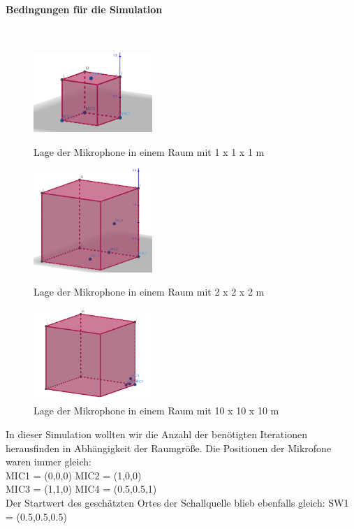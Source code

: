 \paragraph{Bedingungen für die Simulation}\ \\
\begin{figure}
\centering 
\includegraphics[width=0.4\textwidth]{Lage_MIC_AW2}
\caption{Lage der Mikrophone in einem Raum mit 1 x 1 x 1 m}\label{fig:Lage der Mikrophone in einem Raum mit 1 x 1 x 1 m}
\includegraphics[width=0.4\textwidth]{Lage_MIC_AW2_2}
\caption{Lage der Mikrophone in einem Raum mit 2 x 2 x 2 m}\label{fig:Lage der Mikrophone in einem Raum mit 2 x 2 x 2 m}
\includegraphics[width=0.4\textwidth]{Lage_MIC_AW2_10}
\caption{Lage der Mikrophone in einem Raum mit 10 x 10 x 10 m}\label{fig:Lage der Mikrophone in einem Raum mit 10 x 10 x 10 m}
\end{figure}
In dieser Simulation wollten wir die Anzahl der benötigten Iterationen herausfinden in Abhängigkeit der Raumgröße. 
Die Positionen der Mikrofone waren immer gleich:\\
MIC1 = (0,0,0)
MIC2 = (1,0,0)\\
MIC3 = (1,1,0)
MIC4 = (0.5,0.5,1)\\

Der Startwert des geschätzten Ortes der Schallquelle blieb ebenfalls gleich: SW1 = (0.5,0.5,0.5)\\

